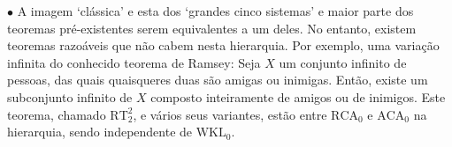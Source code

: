 \documentclass{article}
\theoremstyle{nonumberplain}
\newcommand{\RCA}{\mathrm{RCA}}
\newcommand{\WKL}{\mathrm{WKL}}
\newcommand{\ACA}{\mathrm{ACA}}
\newcommand\point[1]{\noindent \hspace{\labelsep} $\bullet$ #1 \smallskip}
\begin{document}
\point{A imagem `clássica' e esta dos `grandes cinco sistemas' e maior parte dos teoremas pré-existentes serem equivalentes a um deles. No entanto, existem teoremas razoáveis que não cabem nesta hierarquia. Por exemplo, uma variação infinita do conhecido teorema de Ramsey: Seja $X$ um conjunto infinito de pessoas, das quais quaisqueres duas são amigas ou inimigas. Então, existe um subconjunto infinito de $X$ composto inteiramente de amigos ou de inimigos. Este teorema, chamado $\mathrm{RT}^2_2$, e vários seus variantes, estão entre $\RCA_0$ e $\ACA_0$ na hierarquia, sendo independente de $\WKL_0$.}
\end{document}

